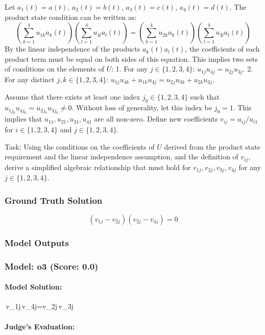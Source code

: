 \documentclass[10pt]{article}
\begin{document}
Let $a_1(t) = a(t)$, $a_2(t) = b(t)$, $a_3(t) = c(t)$, $a_4(t) = d(t)$. The product state condition can be written as:
$$ \left( \sum_{k=1}^4 u_{1k} a_k(t) \right) \left( \sum_{l=1}^4 u_{4l} a_l(t) \right) = \left( \sum_{k=1}^4 u_{2k} a_k(t) \right) \left( \sum_{l=1}^4 u_{3l} a_l(t) \right) $$
By the linear independence of the products $a_k(t)a_l(t)$, the coefficients of each product term must be equal on both sides of this equation. This implies two sets of conditions on the elements of $U$:
1. For any $j \in \{1,2,3,4\}$: $u_{1j}u_{4j} = u_{2j}u_{3j}$.
2. For any distinct $j, k \in \{1,2,3,4\}$: $u_{1j}u_{4k} + u_{1k}u_{4j} = u_{2j}u_{3k} + u_{2k}u_{3j}$.

Assume that there exists at least one index $j_0 \in \{1,2,3,4\}$ such that $u_{1j_0}u_{4j_0} = u_{2j_0}u_{3j_0} \neq 0$. Without loss of generality, let this index be $j_0=1$. This implies that $u_{11}, u_{21}, u_{31}, u_{41}$ are all non-zero. Define new coefficients $v_{ij} = u_{ij}/u_{i1}$ for $i \in \{1,2,3,4\}$ and $j \in \{1,2,3,4\}$.

Task:
Using the conditions on the coefficients of $U$ derived from the product state requirement and the linear independence assumption, and the definition of $v_{ij}$, derive a simplified algebraic relationship that must hold for $v_{1j}, v_{2j}, v_{3j}, v_{4j}$ for any $j \in \{1,2,3,4\}$.

\subsubsection*{Ground Truth Solution}
\[ \boxed{(v_{1j} - v_{2j})(v_{2j} - v_{4j}) = 0} \]

\subsubsection*{Model Outputs}
\subsubsection*{Model: o3 (Score: 0.0)}
\paragraph*{Model Solution:}
\,v_{1j}\,v_{4j}=v_{2j}\,v_{3j}\,

\paragraph*{Judge's Evaluation:}
\end{document}
